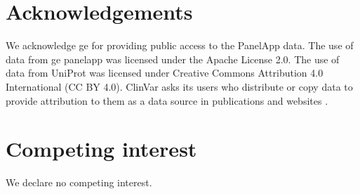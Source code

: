 \section*{Acknowledgements}
\noindent
We acknowledge \ac{ge} for providing public access to the PanelApp data.
The use of data from \ac{ge} panelapp was licensed under the Apache License 2.0.
The use of data from UniProt was licensed under Creative Commons Attribution 4.0 International (CC BY 4.0).
ClinVar asks its users who distribute or copy data to provide attribution to them as a data source in publications and websites \cite{landrum_clinvar_2018}.

\section*{Competing interest}
\noindent
We declare no competing interest. 



\clearpage

